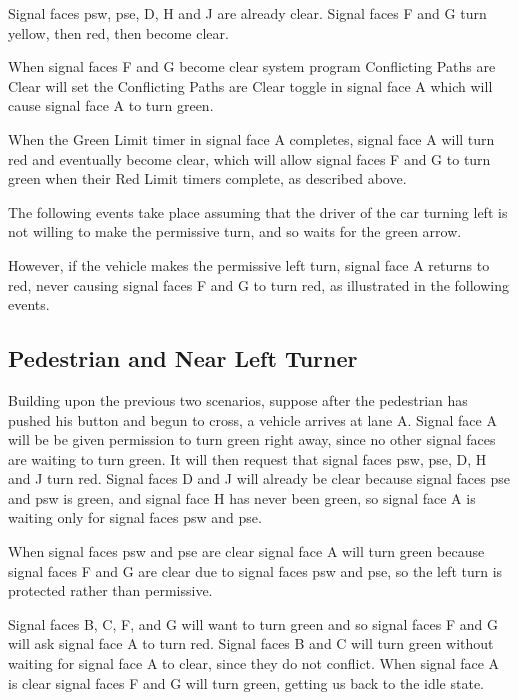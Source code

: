 \documentclass[letterpaper,twoside]{article}
\begin{document}
Signal faces psw, pse, D, H and J are already clear.  Signal faces F and G turn
yellow, then red, then become clear.

When signal faces F and G become clear system program Conflicting Paths
are Clear will set the Conflicting Paths are Clear toggle in signal face
A which will cause signal face A to turn green.

When the Green Limit timer in signal face A completes, signal face
A will turn red and eventually become clear, which will allow
signal faces F and G to turn green when their Red Limit timers complete,
as described above.

The following events take place assuming that the driver of the
car turning left is not willing to make the permissive turn,
and so waits for the green arrow.



However, if the vehicle makes the permissive left turn, signal face A
returns to red, never causing signal faces F and G to turn red,
as illustrated in the following events.



\subsection{Pedestrian and Near Left Turner}

Building upon the previous two scenarios, suppose after the pedestrian
has pushed his button and begun to cross, a vehicle arrives at lane A.
Signal face A will be be given permission to turn green right away, since no
other signal faces are waiting to turn green.  It will then request
that signal faces psw, pse, D, H and J turn red.  Signal faces D and J
will already be clear because signal faces pse and psw is green,
and signal face H has never been green, so signal face A is waiting
only for signal faces psw and pse.

When signal faces psw and pse are clear signal face A will turn green because
signal faces F and G are clear due to signal faces psw and pse,
so the left turn is protected rather than permissive.

Signal faces B, C, F, and G will want to turn green and so signal faces
F and G will ask signal face A to turn red.  Signal faces B and C
will turn green without waiting for signal face A to clear, since
they do not conflict.  When signal face A is clear signal faces
F and G will turn green, getting us back to the idle state.
\end{document}
